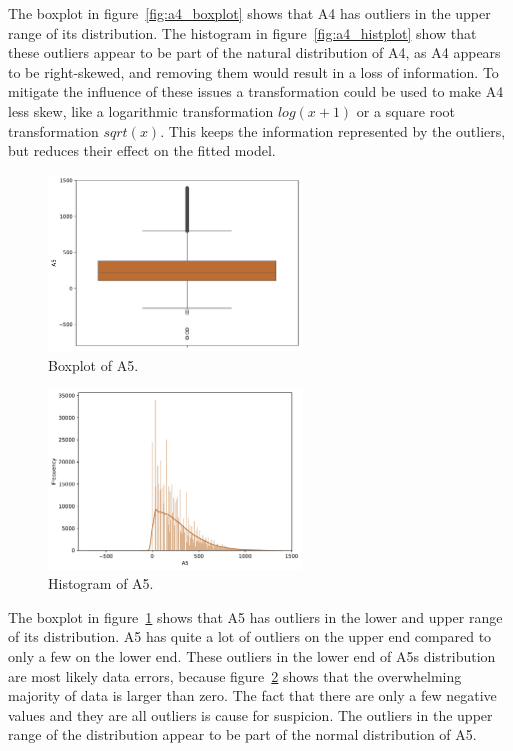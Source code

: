 \documentclass[11pt]{report}
\begin{document}
The boxplot in figure~\ref{fig:a4_boxplot} shows that A4 has outliers in the upper range of its distribution. The histogram in figure~\ref{fig:a4_histplot} show that these outliers appear to be part of the natural distribution of A4, as A4 appears to be right-skewed, and removing them would result in a loss of information. To mitigate the influence of these issues a transformation could be used to make A4 less skew, like a logarithmic transformation $log(x+1)$ or a square root transformation $sqrt(x)$. This keeps the information represented by the outliers, but reduces their effect on the fitted model.

\begin{figure}[H]
    \centering
    \includegraphics[width=0.6\textwidth]{images/A5_boxplot.pdf}
    \caption{Boxplot of A5.}
    \label{fig:a5_boxplot}
\end{figure}


\begin{figure}[H]
    \centering
    \includegraphics[width=0.6\textwidth]{images/A5_histplot.pdf}
    \caption{Histogram of A5.}
    \label{fig:a5_histplot}
\end{figure}

The boxplot in figure~\ref{fig:a5_boxplot} shows that A5 has outliers in the lower and upper range of its distribution. A5 has quite a lot of outliers on the upper end compared to only a few on the lower end. These outliers in the lower end of A5s distribution are most likely data errors, because figure~\ref{fig:a5_histplot} shows that the overwhelming majority of data is larger than zero. The fact that there are only a few negative values and they are all outliers is cause for suspicion. The outliers in the upper range of the distribution appear to be part of the normal distribution of A5.
\end{document}
